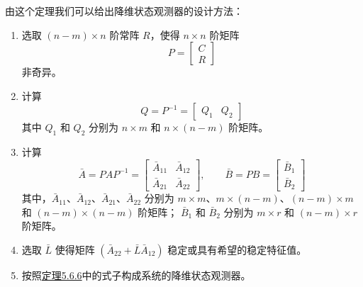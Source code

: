 由这个定理我们可以给出降维状态观测器的设计方法：
\begin{anymark}[线性系统的降维状态观测器设计]
    \begin{enumerate}[label=\textbf{第 \arabic* 步.}, leftmargin=*]
        \item 选取 $(n-m)\times n$ 阶常阵 $R$，使得 $n\times n$ 阶矩阵
        \[
        P=
        \begin{bmatrix}
        C\\
        R
        \end{bmatrix}
        \]
        非奇异。

        \item 计算
        \[
        Q=P^{-1}=
        \begin{bmatrix}
        Q_1 & Q_2
        \end{bmatrix}
        \]
        其中 $Q_1$ 和 $Q_2$ 分别为 $n\times m$ 和 $n\times(n-m)$ 阶矩阵。

        \item 计算
        \[
        \bar{A}=PAP^{-1}
        =
        \begin{bmatrix}
        \bar{A}_{11} & \bar{A}_{12}\\
        \bar{A}_{21} & \bar{A}_{22}
        \end{bmatrix},
        \qquad
        \bar{B}=PB
        =
        \begin{bmatrix}
        \bar{B}_1\\
        \bar{B}_2
        \end{bmatrix}
        \]
        其中，$\bar{A}_{11}$、$\bar{A}_{12}$、$\bar{A}_{21}$、$\bar{A}_{22}$ 分别为
        $m\times m$、$m\times(n-m)$、$(n-m)\times m$ 和 $(n-m)\times(n-m)$ 阶矩阵；
        $\bar{B}_1$ 和 $\bar{B}_2$ 分别为 $m\times r$ 和 $(n-m)\times r$ 阶矩阵。

        \item 选取 $\bar{L}$ 使得矩阵
        $(\bar{A}_{22}+\bar{L}\bar{A}_{12})$ 稳定或具有希望的稳定特征值。

        \item 按照\hyperref[theorem5.6.6]{定理5.6.6}中的式子构成系统的降维状态观测器。
    \end{enumerate}
\end{anymark}

